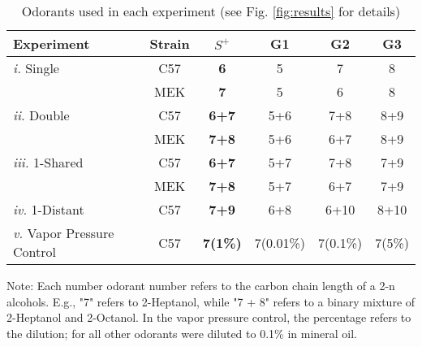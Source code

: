 \begin{table}
\label{tab:design}
    \begin{tabular}{ l | c | c | c | c | c }
        Experiment & Strain & \textbf{$S^+$} & G1 & G2 & G3 \\ 
        \hline
        \textit{i.} Single & C57 & \textbf{6} & 5 & 7 & 8 \\ 
         & MEK & \textbf{7} & 5 & 6 & 8 \\ 
        \hline
        \textit{ii.} Double & C57 & \textbf{6+7} & 5+6 & 7+8 & 8+9 \\ 
         & MEK & \textbf{7+8} & 5+6 & 6+7 & 8+9 \\ 
        \hline
        \textit{iii.} 1-Shared & C57 & \textbf{6+7} & 5+7 & 7+8 & 7+9 \\ 
         & MEK & \textbf{7+8} & 5+7 & 6+7 & 7+9 \\ 
        \hline
        \textit{iv.} 1-Distant & C57 & \textbf{7+9} & 6+8 & 6+10 & 8+10 \\ 
        \hline
        \textit{v.} Vapor Pressure Control & C57 & \textbf{7(1\%)} & 7(0.01\%) & 7(0.1\%) & 7(5\%) \\ 
    \end{tabular}
    \caption{Odorants used in each experiment (see Fig. \ref{fig:results} for details)}
\end{table}
Note: Each number odorant number refers to the carbon chain length of a 2-n alcohols. E.g., "7" refers to 2-Heptanol, while "7 + 8" refers to a binary mixture of 2-Heptanol and 2-Octanol. In the vapor pressure control, the percentage refers to the dilution; for all other odorants were diluted to {0.1\%} in mineral oil.